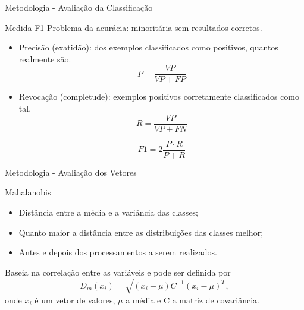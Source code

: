 \documentclass{beamer}
\begin{document}
\begin{frame}{Metodologia - Avaliação da Classificação}
\setlength\leftmargini{1em}
\begin{block}{Medida F1}
\justifying
Problema da acurácia: minoritária sem resultados corretos. \\
\begin{itemize}

\item Precisão (exatidão): dos exemplos classificados como positivos, quantos realmente são.
\vspace{-1.5em}
\begin{equation*}
  P = \frac{VP}{VP + FP}
\end{equation*}
\item Revocação (completude): exemplos positivos corretamente classificados como tal. 
\begin{equation*}
  R = \frac{VP}{VP + FN}
\end{equation*}

\pause
\begin{equation*}
  F1 = 2 \frac{P \cdot R}{P+R}
\end{equation*}
\end{itemize}
\end{block}
\end{frame}
\begin{frame}{Metodologia - Avaliação dos Vetores}
\justifying
\setlength\leftmargini{1em}
\begin{block}{Mahalanobis}  %

\begin{itemize}
\item Distância entre a média e a variância das classes;
\item Quanto maior a distância entre as distribuições das classes melhor;
\item Antes e depois dos processamentos a serem realizados.
\end{itemize}
\vspace{4pt}

Baseia na correlação entre as variáveis e pode ser definida por
\begin{equation*}
  D_m(x_i) = \sqrt{(x_i - \mu)C^{-1}(x_i-\mu)^T},
\end{equation*}
\noindent onde $x_i$ é um vetor de valores, $\mu$ a média e C a matriz de covariância.
\end{block}
\end{frame}
\end{document}
